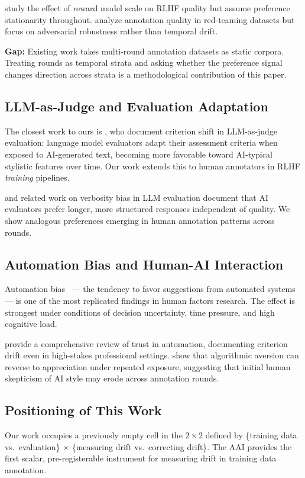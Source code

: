 \citet{Ziegler2019Fine} study the effect of reward model scale on RLHF quality but assume preference stationarity throughout. \citet{Perez2022Red} analyze annotation quality in red-teaming datasets but focus on adversarial robustness rather than temporal drift.

\textbf{Gap:} Existing work takes multi-round annotation datasets as static corpora. Treating rounds as temporal strata and asking whether the preference signal changes direction across strata is a methodological contribution of this paper.

\subsection{LLM-as-Judge and Evaluation Adaptation}

The closest work to ours is \citet{Thakur2024Judging}, who document criterion shift in LLM-as-judge evaluation: language model evaluators adapt their assessment criteria when exposed to AI-generated text, becoming more favorable toward AI-typical stylistic features over time. Our work extends this to human annotators in RLHF \emph{training} pipelines.

\citet{Liang2023Holistic} and related work on verbosity bias in LLM evaluation document that AI evaluators prefer longer, more structured responses independent of quality. We show analogous preferences emerging in human annotation patterns across rounds.

\subsection{Automation Bias and Human-AI Interaction}

Automation bias~\citep{Skitka1999Accountability,Parasuraman2010Complacency} --- the tendency to favor suggestions from automated systems --- is one of the most replicated findings in human factors research. The effect is strongest under conditions of decision uncertainty, time pressure, and high cognitive load.

\citet{Lee2004Trust} provide a comprehensive review of trust in automation, documenting criterion drift even in high-stakes professional settings. \citet{Dietvorst2015Algorithm} show that algorithmic aversion can reverse to appreciation under repeated exposure, suggesting that initial human skepticism of AI style may erode across annotation rounds.

\subsection{Positioning of This Work}

Our work occupies a previously empty cell in the $2\times2$ defined by \{training data vs.\ evaluation\} $\times$ \{measuring drift vs.\ correcting drift\}. The AAI provides the first scalar, pre-registerable instrument for measuring drift in training data annotation.
